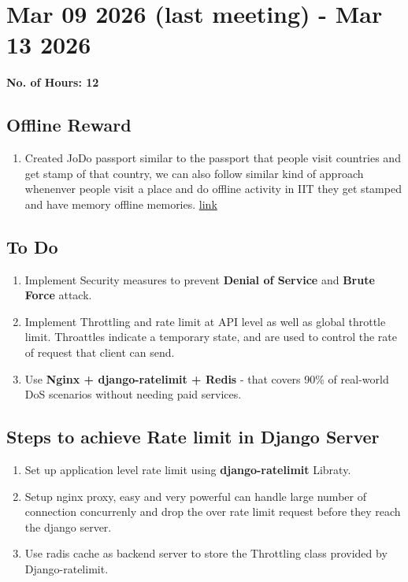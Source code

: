 \documentclass[12pt]{article}
\begin{document}
\section{Mar 09 2026 (last meeting) - Mar 13 2026}
{\bf No. of Hours: 12}
\subsection{Offline Reward}
\begin{enumerate}
    \item Created JoDo passport similar to the passport that people visit countries and get stamp of that country, we can also follow similar kind of approach whenenver people visit a place and do offline activity in IIT they get stamped and have memory offline memories. \href{https://drive.google.com/file/d/1oMPdChhu_n5pfZ2k6dNrNa-poAVlBPzW/view?usp=sharing}{link}
\end{enumerate}
\subsection{To Do}
\begin{enumerate}
    \item Implement Security measures to prevent \textbf{Denial of Service} and \textbf{Brute Force} attack.
    \item Implement Throttling and rate limit at API level as well as global throttle limit. Throattles indicate a temporary state, and are used to control the rate of request that client can send.
    \item Use \textbf{Nginx + django-ratelimit + Redis} - that covers 90\% of real-world DoS scenarios without needing paid services.
\end{enumerate}
\subsection{Steps to achieve Rate limit in Django Server}
\begin{enumerate}
    \item Set up application level rate limit using \textbf{django-ratelimit} Libraty.
    \item Setup nginx proxy, easy and very powerful can handle large number of connection concurrenly and drop the over rate limit request before they reach the django server.
    \item Use radis cache as backend server to store the Throttling class provided by Django-ratelimit.
\end{enumerate}
\end{document}
